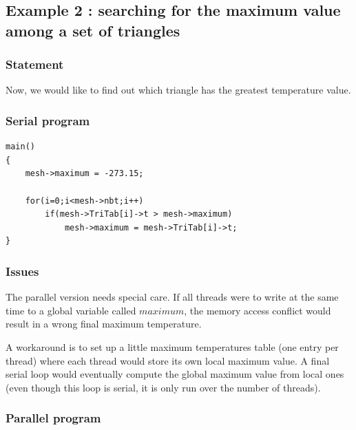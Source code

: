 \documentclass[a4paper,12pt]{article}
\begin{document}
\subsection{Example 2 : searching for the maximum value among a set of triangles}

\subsubsection{Statement}
Now, we would like to find out which triangle has the greatest temperature value.

\subsubsection{Serial program}

\begin{tt}
\begin{verbatim}
main()
{
    mesh->maximum = -273.15;

    for(i=0;i<mesh->nbt;i++)
        if(mesh->TriTab[i]->t > mesh->maximum)
            mesh->maximum = mesh->TriTab[i]->t;
}
\end{verbatim}
\end{tt}
\normalfont

\subsubsection{Issues}

The parallel version needs special care. If all threads were to write at the same time to a global variable called $maximum$, the memory access conflict would result in a wrong final maximum temperature.

A workaround is to set up a little maximum temperatures table (one entry per thread) where each thread would store its own local maximum value. A final serial loop would eventually compute the global maximum value from local ones (even though this loop is serial, it is only run over the number of threads).

\subsubsection{Parallel program}
\end{document}
